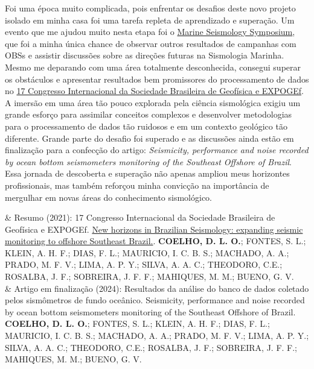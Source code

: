 \documentclass[10pt,a4paper,oneside]{book}
\begin{document}
Foi uma época muito complicada, pois enfrentar os desafios deste novo projeto isolado em minha casa foi uma tarefa repleta de aprendizado e superação. Um evento que me ajudou muito nesta etapa foi o \href{https://www.iris.edu/hq/workshops/2021/03/mss}{Marine Seismology Symposium}, que foi a minha única chance de observar outros resultados de campanhas com OBSs e assistir discussões sobre as direções futuras na Sismologia Marinha. Mesmo me deparando com uma área totalmente desconhecida, consegui superar os obstáculos e apresentar resultados bem promissores do processamento de dados no \href{https://sbgf.org.br/17th_cisbgf/}{17 Congresso Internacional da Sociedade Brasileira de Geofísica e EXPOGEf}. A imersão em uma área tão pouco explorada pela ciência sismológica exigiu um grande esforço para assimilar conceitos complexos e desenvolver metodologias para o processamento de dados tão ruidosos e em um contexto geológico tão diferente. Grande parte do desafio foi superado e as discussões ainda estão em finalização para a confecção do artigo: \textit{Seismicity, performance and noise recorded by ocean bottom seismometers monitoring of the Southeast Offshore of Brazil}. Essa jornada de descoberta e superação não apenas ampliou meus horizontes profissionais, mas também reforçou minha convicção na importância de mergulhar em novas áreas do conhecimento sismológico.

\bigskip

\begin{summarybox}[frametitle=\faBookmark{}\quad Resumo de atividades científicas]
	\begin{fa-ul}
		\faBook & Resumo (2021):  17 Congresso Internacional da Sociedade Brasileira de Geofísica e EXPOGEf. \href{https://sbgf.org.br/mysbgf/eventos/expanded_abstracts/17th_CISBGf/170620210624192518Expanded_abstract_SBGf_2021.pdf}{ New horizons in Brazilian Seismology: expanding seismic monitoring to offshore Southeast Brazil.}. \textbf{COELHO, D. L. O.}; FONTES, S. L.; KLEIN, A. H. F.; DIAS, F. L.; MAURICIO, I. C. B. S.; MACHADO, A. A.; PRADO, M. F. V.; LIMA, A. P. Y.; SILVA, A. A. C.; THEODORO, C.E.; ROSALBA, J. F.; SOBREIRA, J. F. F.; MAHIQUES, M. M.; BUENO, G. V. \\
\faBook & Artigo em finalização (2024): Resultados da análise do banco de dados coletado pelos sismômetros de fundo oceânico. Seismicity, performance and noise recorded by ocean bottom seismometers monitoring of the Southeast Offshore of Brazil. \textbf{COELHO, D. L. O.}; FONTES, S. L.; KLEIN, A. H. F.; DIAS, F. L.; MAURICIO, I. C. B. S.; MACHADO, A. A.; PRADO, M. F. V.; LIMA, A. P. Y.; SILVA, A. A. C.; THEODORO, C.E.; ROSALBA, J. F.; SOBREIRA, J. F. F.; MAHIQUES, M. M.; BUENO, G. V. 
	\end{fa-ul}
\end{summarybox}
\end{document}
